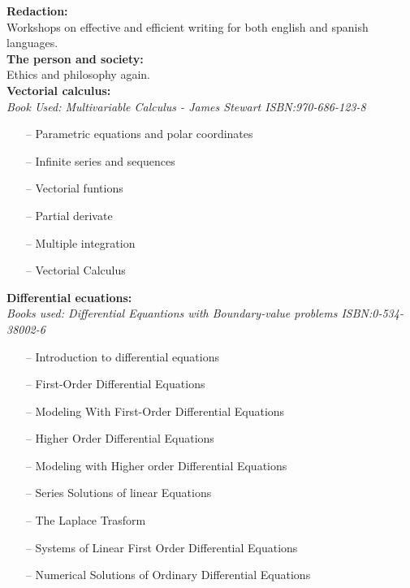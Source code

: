 \documentclass{article}
\begin{document}
\textbf{Redaction:}\\
  Workshops on effective and efficient writing for both english and spanish languages.\\


\textbf{The person and society:}\\
  Ethics and philosophy again.\\


\textbf{Vectorial calculus:}\\
    \emph{Book Used: Multivariable Calculus - James Stewart ISBN:970-686-123-8}
    \begin{itemize}
     \setlength\itemsep{0pt}
        \item[--]  Parametric equations and polar coordinates
        \item[--]  Infinite series and sequences
        \item[--]  Vectorial funtions
        \item[--]  Partial derivate
        \item[--]  Multiple integration
        \item[--]  Vectorial Calculus
    \end{itemize}

\textbf{Differential ecuations:}\\
    \emph{Books used: Differential Equantions with Boundary-value problems ISBN:0-534-38002-6}\\
  \begin{itemize}
     \setlength\itemsep{0pt}
      \item[--] Introduction to differential equations
      \item[--] First-Order Differential Equations
      \item[--] Modeling With First-Order Differential Equations
      \item[--] Higher Order Differential Equations
      \item[--] Modeling with Higher order Differential Equations
      \item[--] Series Solutions of linear Equations
      \item[--] The Laplace Trasform
      \item[--] Systems of Linear First Order Differential Equations
      \item[--] Numerical Solutions of Ordinary Differential Equations
  \end{itemize}
\end{document}
